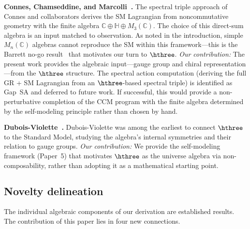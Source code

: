 \medskip
\noindent\textbf{Connes, Chamseddine, and Marcolli~\cite{CCM2007}.}
The spectral triple approach of Connes and collaborators derives the
SM Lagrangian from noncommutative geometry with the finite algebra
$\mathbb{C}\oplus\mathbb{H}\oplus M_3(\mathbb{C})$.  The choice of
this direct-sum algebra is an input matched to observation.  As noted
in the introduction, simple $M_n(\mathbb{C})$ algebras cannot
reproduce the SM within this framework---this is the Barrett
no-go result~\cite{Barrett2007} that motivates our turn to
$\hthree$.
\emph{Our contribution:} The present work provides the algebraic
input---gauge group and chiral representation---from the $\hthree$
structure.  The spectral action computation (deriving the full
GR + SM Lagrangian from an $\hthree$-based spectral triple) is
identified as Gap~SA and deferred to future work.  If successful,
this would provide a non-perturbative completion of the CCM program
with the finite algebra determined by the self-modeling principle
rather than chosen by hand.

\medskip
\noindent\textbf{Dubois-Violette~\cite{DuboisViolette2016}.}
Dubois-Violette was among the earliest to connect $\hthree$ to the
Standard Model, studying the algebra's internal symmetries and their
relation to gauge groups.
\emph{Our contribution:} We provide the self-modeling framework
(Paper~5) that motivates $\hthree$ as the universe algebra via
non-composability, rather than adopting it as a mathematical starting
point.

\subsection{Novelty delineation}\label{sec:novelty}

The individual algebraic components of our derivation are established
results.  The contribution of this paper lies in four new
connections.

